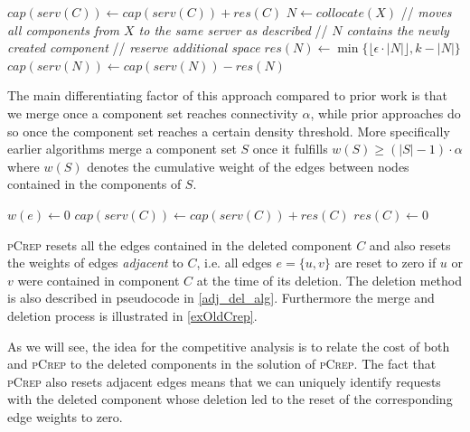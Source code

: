 \documentclass[a4paper,UKenglish,cleveref, autoref, thm-restate,authorcolumns]{lipics-v2019}
\newcommand{\adjDel}{\textsc{pCrep}}
\newcommand{\opt}{\text{O{\scriptsize PT}}}
\begin{document}
\begin{algorithm}[t]
	\caption{mergeAndRes($X$)}
	\label{mergeAndRes}
	\begin{algorithmic}
		\STATE $cap(serv(C))\gets cap(serv(C))+res(C)$		
		\ENDFOR
		\STATE $N\gets collocate(X)$  // \emph{moves all components from $X$ to the same server as described} 
		\STATE // \emph{$N$ contains the newly created component} 
		\STATE // \emph{reserve additional space} 
		\STATE $res(N)\gets\min\{\lfloor\epsilon\cdot|N|\rfloor,k-|N|\}$
		\STATE $cap(serv(N))\gets cap(serv(N))-res(N)$
		\ENDIF	
		
		
	\end{algorithmic}
\end{algorithm}

 The main differentiating factor of this approach compared
to prior work \cite{Avin2015,Avin2016} is that we merge once a 
component set reaches connectivity $\alpha$, while prior approaches do so once the component set reaches a certain density threshold. More specifically earlier algorithms
 merge a component set $S$ once it fulfills $w(S)\geq(|S|-1)\cdot\alpha$ where $w(S)$ denotes the cumulative weight of the edges between nodes contained in the components of $S$.

\begin{algorithm}
	\caption{delete($Y$) of \adjDel{}}
	\label{adj_del_alg}
	\begin{algorithmic}
		\FORALL{$e=\{u,v\}\in E$}
		\IF{$u\in Y$ or $v\in Y$}
		\STATE $w(e)\gets0$
		\ENDIF
		\ENDFOR
		\FORALL{$C\in Y$}
		\STATE $cap(serv(C))\gets cap(serv(C)) +res(C)$
		\STATE $res(C)\gets 0$			
		\ENDFOR
	\end{algorithmic}
\end{algorithm}

\adjDel{} resets all the edges contained in the deleted component $C$ and also resets the weights of edges \textit{adjacent} to $C$, i.e. all edges $e=\{u,v\}$ are reset to zero if $u$ or $v$ were contained in component $C$ at the time of its deletion. The deletion method is also described in pseudocode in \cref{adj_del_alg}.
Furthermore the merge and deletion process is illustrated in \cref{exOldCrep}.

As we will see, the idea for the competitive analysis is to relate the cost of both \opt{} and \adjDel{} to the deleted components in the solution of \adjDel{}.
The fact that \adjDel{} also resets adjacent edges means that we can uniquely identify requests with the deleted component whose deletion led to the reset of the corresponding edge weights to zero. 
\end{document}
